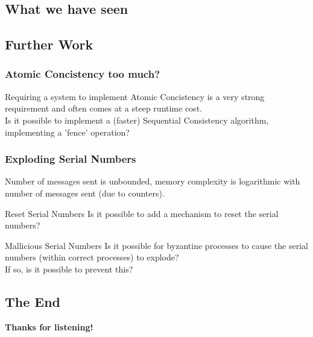 \subsection{What we have seen}
\begin{frame}
\end{frame}

\subsection{Further Work}
\begin{frame}
    \frametitle{Atomic Concistency too much?}
    Requiring a system to implement Atomic Concistency is a very strong requirement and
    often comes at a steep runtime cost.\\
    Is it possible to implement a (faster) Sequential Consistency algorithm,
    implementing a 'fence' operation?
\end{frame}

\begin{frame}
    \frametitle{Exploding Serial Numbers}
    Number of messages sent is unbounded, memory complexity
    is logarithmic with number of messages sent (due to counters).
    \begin{block}{Reset Serial Numbers}
        Is it possible to add a mechanism to reset the serial numbers?
    \end{block}
    \begin{block}{Mallicious Serial Numbers}
        Is it possible for byzantine processes to cause the serial numbers (within correct processes) to explode?\\
        If so, is it possible to prevent this?
    \end{block}
\end{frame}

\subsection{The End}
\begin{frame}
    \begin{center}
        \textbf{Thanks for listening!}
    \end{center}
\end{frame}